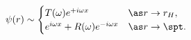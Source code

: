 \begin{equation}
\psi(r) \sim
\begin{cases}
T(\omega) e^{+i \omega x} & \as r \to r_H, \\
e^{i \omega x} + R(\omega) e^{-i \omega x} & \as r \to \spt. \label{imaginary-transmission-boundary-repeated}
\end{cases}
\end{equation}

